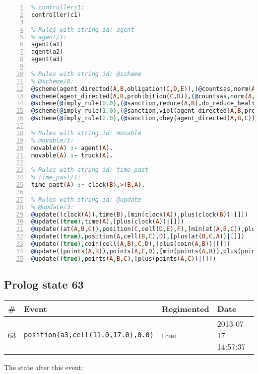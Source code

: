 \documentclass[11pt]{article}\usepackage[utf8]{inputenc}\usepackage{geometry}
\begin{document}
\begin{lstlisting}[language=Prolog, numbers=left]
% Rules with string id: controller
% controller/1:
controller(c1)

% Rules with string id: agent
% agent/1:
agent(a1)
agent(a2)
agent(a3)

% Rules with string id: @scheme
% @scheme/8:
@scheme(agent_directed(A,B,obligation(C,D,E)),(@countsas,norm(A,B,F,obligation(C,D,E)),F),false,(listTrue(C)),(time_past(D)),false,[plus(viol(agent_directed(A,B,obligation(C,D,E))))|[]],[plus(obey(agent_directed(A,B,obligation(C,D,E))))|[]])
@scheme(agent_directed(A,B,prohibition(C,D)),(@countsas,norm(A,B,E,prohibition(C,D)),E),(listTrue(C)),false,(false),false,[plus(viol(agent_directed(A,B,prohibition(C,D))))|[]],[plus(obey(agent_directed(A,B,prohibition(C,D))))|[]])
@scheme(@imply_rule(0.0),(@sanction,reduce(A,B),do_reduce_health(A,B),notifyAgent(A,changed(status))),true,false,false,false,[min(reduce(A,B))|[]],[])
@scheme(@imply_rule(1.0),(@sanction,viol(agent_directed(A,B,prohibition(C,D))),do_sanction(D)),true,false,false,false,[min(viol(agent_directed(A,B,prohibition(C,D))))|[]],[])
@scheme(@imply_rule(2.0),(@sanction,obey(agent_directed(A,B,C))),true,false,false,false,[min(obey(agent_directed(A,B,C)))|[]],[])

% Rules with string id: movable
% movable/1:
movable(A) :- agent(A).
movable(A) :- truck(A).

% Rules with string id: time_past
% time_past/1:
time_past(A) :- clock(B),>(B,A).

% Rules with string id: @update
% @update/3:
@update((clock(A)),time(B),[min(clock(A)),plus(clock(B))|[]])
@update((true),time(A),[plus(clock(A))|[]])
@update((at(A,B,C)),position(C,cell(D,E),F),[min(at(A,B,C)),plus(at(D,E,C))|[]])
@update((true),position(A,cell(B,C),D),[plus(at(B,C,A))|[]])
@update((true),coin(cell(A,B),C,D),[plus(coin(A,B))|[]])
@update((points(A,B)),points(A,C,D),[min(points(A,B)),plus(points(A,D))|[]])
@update((true),points(A,B,C),[plus(points(A,C))|[]])

\end{lstlisting}
\clearpage 
\subsection{Prolog state 63}
\begin{table}[ht]
\centering 
\begin{tabular}{l l l l} 
\textbf{\#} & \textbf{Event} & \textbf{Regimented} & \textbf{Date} \\ [0.5ex] 
\hline
63&\texttt{position(a3,cell(11.0,17.0),0.0)}&true&2013-07-17 14:57:37\\ [1ex] \hline\end{tabular}
\end{table}
The state after this event:
\end{document}
